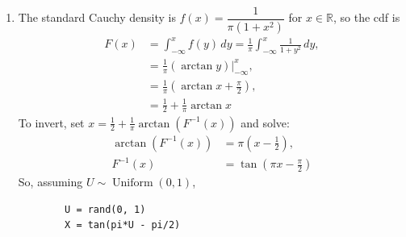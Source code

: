 \documentclass[11pt]{article}
\begin{document}
\begin{enumerate}[label=(\alph*)]
    \item
    The standard Cauchy density is $f(x) = \dfrac{1}{\pi(1+x^2)}$ for $x \in \mathbb{R}$, so the cdf
    is
    \begin{align*}
        F(x) &= \int_{-\infty}^{x} f(y) \, dy = \frac{1}{\pi}\int_{-\infty}^{x} \frac{1}{1+y^2} \, dy, \\
             &= \frac{1}{\pi}\left(\arctan y \right)\Big|_{-\infty}^{x}, \\
             &= \frac{1}{\pi}\left(\arctan x + \frac{\pi}{2}\right), \\
             &= \frac{1}{2} + \frac{1}{\pi}\arctan x
    \end{align*}
    To invert, set $x = \frac{1}{2} + \frac{1}{\pi}\arctan\!\left(F^{-1}(x)\right)$ and solve:
    \begin{align*}
        \arctan\!\left(F^{-1}(x)\right) &= \pi\left(x - \frac{1}{2}\right), \\
        F^{-1}(x) &= \tan\!\left(\pi x - \frac{\pi}{2}\right)
    \end{align*}
    So, assuming $U \sim \operatorname{Uniform}(0, 1)$,
    \begin{verbatim}
        U = rand(0, 1)
        X = tan(pi*U - pi/2)
    \end{verbatim}


\end{enumerate}
\end{document}
